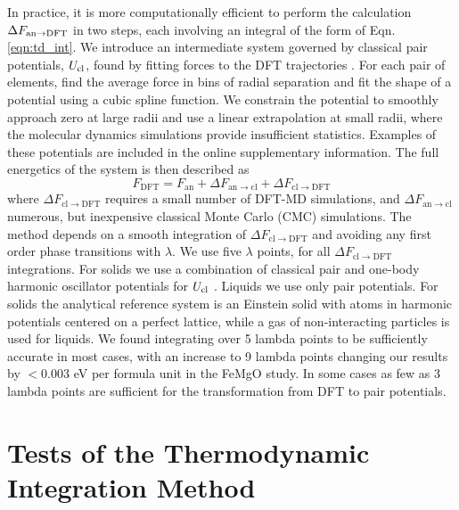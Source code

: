 In practice, it is more computationally efficient to perform the calculation $\Delta
F_{\rm an\to DFT}$ in two steps, each involving an integral of the form of Eqn.
\ref{eqn:td_int}. We introduce an intermediate system governed by classical pair
potentials, $U_{\rm cl}$, found by fitting forces to the DFT trajectories
\citep{Wilson2010,Izvekov2004}. For each pair of elements, find the average force in bins
of radial separation and fit the shape of a potential using a cubic spline function. We
constrain the potential to smoothly approach zero at large radii and use a linear
extrapolation at small radii, where the molecular dynamics simulations provide
insufficient statistics. Examples of these potentials are included in the online
supplementary information. The full energetics of the system is then described as
\begin{equation} \label{eqn:two_step}
F_{\mathrm{DFT}}=F_{\mathrm{\mathrm{an}}}+\Delta
F_{\mathrm{an} \to \mathrm{cl}}+\Delta F_{\mathrm{cl}\to \mathrm{DFT}}
\end{equation}
where $\Delta F_{\mathrm{cl}\to \mathrm{DFT}}$ requires a small number of DFT-MD
simulations, and $\Delta F_{\mathrm{an} \to \mathrm{cl}}$ numerous, but inexpensive
classical Monte Carlo (CMC) simulations. The method depends on a smooth integration
of $\Delta F_{\mathrm{cl}\to \mathrm{DFT}}$ and avoiding any first order phase
transitions with $\lambda$.  We use five $\lambda$ points, for all $\Delta
F_{\mathrm{cl}\to \mathrm{DFT}}$ integrations. For solids we use a combination of
classical pair and one-body harmonic oscillator potentials for $U_{\rm cl}$
\citep{Wilson2012a,Wahl2013}.  Liquids we use only pair potentials. For solids the
analytical reference system is an Einstein solid with atoms in harmonic potentials
centered on a perfect lattice, while a gas of non-interacting particles is used for
liquids. We found integrating over 5 lambda points to be sufficiently accurate in
most cases, with an increase to 9 lambda points changing our results by $<0.003$ eV
per formula unit in the FeMgO study. In some cases as few as 3 lambda points are
sufficient for the transformation from DFT to pair potentials. 


\section{Tests of the Thermodynamic Integration Method}

